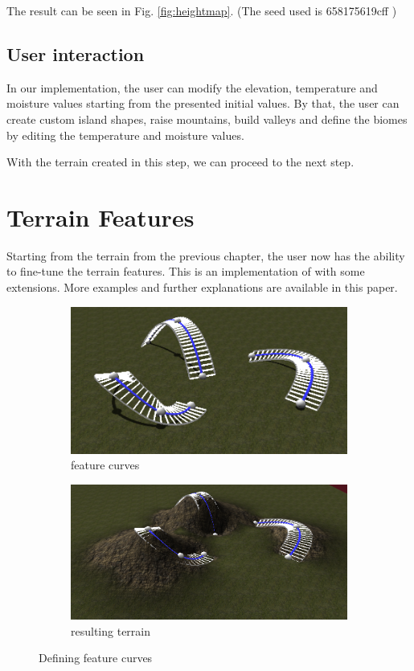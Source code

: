 \documentclass[journal, letterpaper]{IEEEtran}
\begin{document}
The result can be seen in Fig. \ref{fig:heightmap}. (The seed used is 658175619cff )

\subsection{User interaction}
In our implementation, the user can modify the elevation, temperature and moisture values starting from the presented initial values.
By that, the user can create custom island shapes, raise mountains, build valleys and define the biomes by editing the temperature and moisture values.

With the terrain created in this step, we can proceed to the next step.

\section{Terrain Features}\label{TerrainFeatures}
Starting from the terrain from the previous chapter, the user now has the ability to fine-tune the terrain features.
This is an implementation of \cite{Hnaidi.2010} with some extensions. More examples and further explanations are available in this paper.

\begin{figure}
	\centering
	\begin{subfigure}[b]{0.45\textwidth}
		\includegraphics[width=\textwidth]{images/diffusion1}
		\caption{feature curves}
		\label{fig:featurecurves}
	\end{subfigure}
	\begin{subfigure}[b]{0.45\textwidth}
		\includegraphics[width=\textwidth]{images/diffusion2}
		\caption{resulting terrain}
		\label{fig:resultingterrain}
	\end{subfigure}
	\caption{Defining feature curves}\label{fig:diffusion1}
\end{figure}
\end{document}
